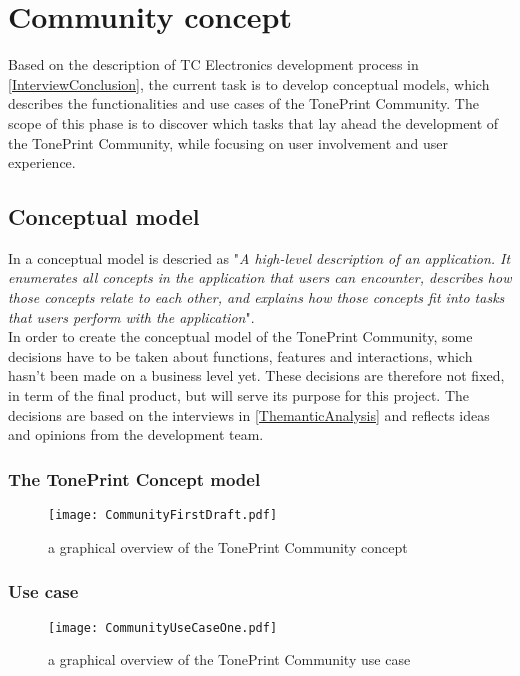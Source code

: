 \chapter{Community concept}
\label{CommunityConcept}
Based on the description of TC Electronics development process in \autoref{InterviewConclusion}, the current task is to develop conceptual models, which describes the functionalities and use cases of the TonePrint Community. The scope of this phase is to discover which tasks that lay ahead the development of the TonePrint Community, while focusing on user involvement and user experience. \\

\section{Conceptual model}
\label{ConceptualModel}
In \parencite[][17]{PDF:Henderson2012} a conceptual model is descried  as "\textit{A high-level description of an application. It enumerates all concepts in the application that users can encounter, describes how those concepts relate to each other, and explains how those concepts fit into tasks that users perform with the application}".\\
In order to create the conceptual model of the TonePrint Community, some decisions have to be taken about functions, features and interactions, which hasn't been made on a business level yet. These decisions are therefore not fixed, in term of the final product, but will serve its purpose for this project. The decisions are based on the interviews in \autoref{ThemanticAnalysis} and reflects ideas and opinions from the development team.

\subsection{The TonePrint Concept model}
\label{TonePrintConceptualModel}


\begin{figure}[H]
	\centering
	\texttt{[image: CommunityFirstDraft.pdf]}
	\caption{a graphical overview of the TonePrint Community concept}
	\label{fig:CommunityConceptualModel}
\end{figure}

\subsection{Use case}

\begin{figure}[H]
	\centering
	\texttt{[image: CommunityUseCaseOne.pdf]}
	\caption{a graphical overview of the TonePrint Community use case}
	\label{fig:CommunityConceptualUseCase}
\end{figure}